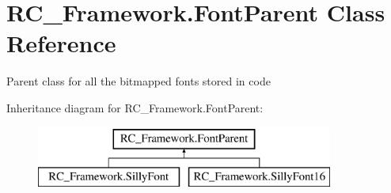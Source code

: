 \hypertarget{class_r_c___framework_1_1_font_parent}{}\section{R\+C\+\_\+\+Framework.\+Font\+Parent Class Reference}
\label{class_r_c___framework_1_1_font_parent}


Parent class for all the bitmapped fonts stored in code  


Inheritance diagram for R\+C\+\_\+\+Framework.\+Font\+Parent\+:\begin{figure}[H]
\begin{center}
\leavevmode
\includegraphics[height=2.000000cm]{class_r_c___framework_1_1_font_parent}
\end{center}
\end{figure}
